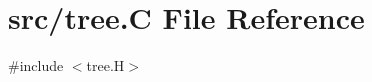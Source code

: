 \hypertarget{tree_8_c}{}\section{src/tree.C File Reference}
\label{tree_8_c}
{\ttfamily \#include $<$tree.\+H$>$}\newline
